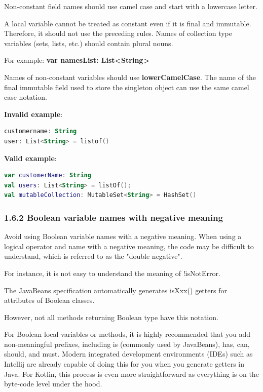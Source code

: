\label{sec:1.6.1}

Non-constant field names should use camel case and start with a lowercase letter.

A local variable cannot be treated as constant even if it is final and immutable. Therefore, it should not use the preceding rules. Names of collection type variables (sets, lists, etc.) should contain plural nouns.

For example: \textbf{var namesList: List<String>}



Names of non-constant variables should use \textbf{lowerCamelCase}. The name of the final immutable field used to store the singleton object can use the same camel case notation.



\textbf{Invalid example}: 

\begin{lstlisting}[language=Kotlin]
customername: String
user: List<String> = listof()
\end{lstlisting}


\textbf{Valid example}: 

\begin{lstlisting}[language=Kotlin]
var customerName: String
val users: List<String> = listOf();
val mutableCollection: MutableSet<String> = HashSet()
\end{lstlisting}


\subsubsection*{\textbf{1.6.2 Boolean variable names with negative meaning}}
\leavevmode\newline

\label{sec:1.6.2}



Avoid using Boolean variable names with a negative meaning. When using a logical operator and name with a negative meaning, the code may be difficult to understand, which is referred to as the "double negative".

For instance, it is not easy to understand the meaning of !isNotError.

The JavaBeans specification automatically generates isXxx() getters for attributes of Boolean classes.

However, not all methods returning Boolean type have this notation.

For Boolean local variables or methods, it is highly recommended that you add non-meaningful prefixes, including is (commonly used by JavaBeans), has, can, should, and must. Modern integrated development environments (IDEs) such as Intellij are already capable of doing this for you when you generate getters in Java. For Kotlin, this process is even more straightforward as everything is on the byte-code level under the hood.



